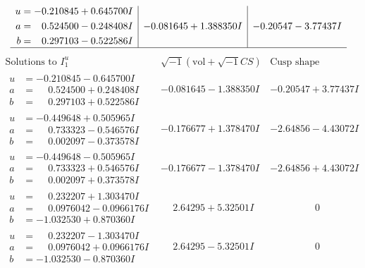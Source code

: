 \documentclass[1p]{elsarticle_modified}
\theoremstyle{definition}
\newcommand{\I}{\sqrt{-1}}
\begin{document}
$$\begin{array}{c|c|c}
\begin{aligned}
u &= -0.210845 + 0.645700 I \\
a &= \phantom{-}0.524500 - 0.248408 I \\
b &= \phantom{-}0.297103 - 0.522586 I\end{aligned}
 & -0.081645 + 1.388350 I & -0.20547 - 3.77437 I\\
 \hline 
 \end{array}$$\newpage$$\begin{array}{c|c|c}  
\text{Solutions to }I^u_{1}& \I (\text{vol} + \sqrt{-1}CS) & \text{Cusp shape}\\
 \hline 
\begin{aligned}
u &= -0.210845 - 0.645700 I \\
a &= \phantom{-}0.524500 + 0.248408 I \\
b &= \phantom{-}0.297103 + 0.522586 I\end{aligned}
 & -0.081645 - 1.388350 I & -0.20547 + 3.77437 I \\ \hline\begin{aligned}
u &= -0.449648 + 0.505965 I \\
a &= \phantom{-}0.733323 - 0.546576 I \\
b &= \phantom{-}0.002097 - 0.373578 I\end{aligned}
 & -0.176677 + 1.378470 I & -2.64856 - 4.43072 I \\ \hline\begin{aligned}
u &= -0.449648 - 0.505965 I \\
a &= \phantom{-}0.733323 + 0.546576 I \\
b &= \phantom{-}0.002097 + 0.373578 I\end{aligned}
 & -0.176677 - 1.378470 I & -2.64856 + 4.43072 I \\ \hline\begin{aligned}
u &= \phantom{-}0.232207 + 1.303470 I \\
a &= \phantom{-}0.0976042 - 0.0966176 I \\
b &= -1.032530 + 0.870360 I\end{aligned}
 & \phantom{-}2.64295 + 5.32501 I & \phantom{-0.000000 } 0 \\ \hline\begin{aligned}
u &= \phantom{-}0.232207 - 1.303470 I \\
a &= \phantom{-}0.0976042 + 0.0966176 I \\
b &= -1.032530 - 0.870360 I\end{aligned}
 & \phantom{-}2.64295 - 5.32501 I & \phantom{-0.000000 } 0 \\ \hline\begin{aligned}

\end{aligned}
\end{array}$$
\end{document}
